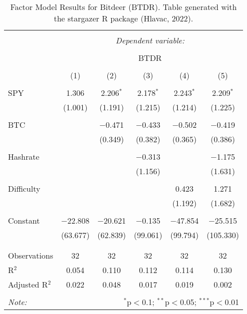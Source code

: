 
\begin{table}[!htbp] \centering 
  \caption{Factor Model Results for Bitdeer (BTDR). Table generated with the stargazer R package (Hlavac, 2022).} 
  \label{ModelResults_BTDR} 
\large 
\begin{tabular}{@{\extracolsep{5pt}}lccccc} 
\\[-1.8ex]\hline 
\hline \\[-1.8ex] 
 & \multicolumn{5}{c}{\textit{Dependent variable:}} \\ 
\cline{2-6} 
\\[-1.8ex] & \multicolumn{5}{c}{BTDR} \\ 
\\[-1.8ex] & (1) & (2) & (3) & (4) & (5)\\ 
\hline \\[-1.8ex] 
 SPY & 1.306 & 2.206$^{*}$ & 2.178$^{*}$ & 2.243$^{*}$ & 2.209$^{*}$ \\ 
  & (1.001) & (1.191) & (1.215) & (1.214) & (1.225) \\ 
  & & & & & \\ 
 BTC &  & $-$0.471 & $-$0.433 & $-$0.502 & $-$0.419 \\ 
  &  & (0.349) & (0.382) & (0.365) & (0.386) \\ 
  & & & & & \\ 
 Hashrate &  &  & $-$0.313 &  & $-$1.175 \\ 
  &  &  & (1.156) &  & (1.631) \\ 
  & & & & & \\ 
 Difficulty &  &  &  & 0.423 & 1.271 \\ 
  &  &  &  & (1.192) & (1.682) \\ 
  & & & & & \\ 
 Constant & $-$22.808 & $-$20.621 & $-$0.135 & $-$47.854 & $-$25.515 \\ 
  & (63.677) & (62.839) & (99.061) & (99.794) & (105.330) \\ 
  & & & & & \\ 
\hline \\[-1.8ex] 
Observations & 32 & 32 & 32 & 32 & 32 \\ 
R$^{2}$ & 0.054 & 0.110 & 0.112 & 0.114 & 0.130 \\ 
Adjusted R$^{2}$ & 0.022 & 0.048 & 0.017 & 0.019 & 0.002 \\ 
\hline 
\hline \\[-1.8ex] 
\textit{Note:}  & \multicolumn{5}{r}{$^{*}$p$<$0.1; $^{**}$p$<$0.05; $^{***}$p$<$0.01} \\ 
\end{tabular} 
\end{table} 
